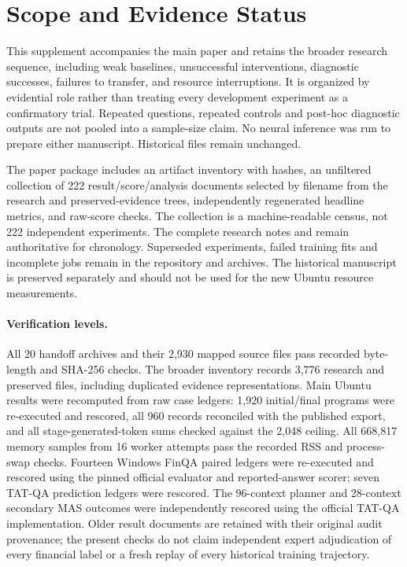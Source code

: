 \documentclass{article}
\begin{document}
\section{Scope and Evidence Status}
This supplement accompanies the main paper and retains the broader research sequence, including weak baselines, unsuccessful interventions, diagnostic successes, failures to transfer, and resource interruptions. It is organized by evidential role rather than treating every development experiment as a confirmatory trial. Repeated questions, repeated controls and post-hoc diagnostic outputs are not pooled into a sample-size claim. No neural inference was run to prepare either manuscript. Historical files remain unchanged.

The paper package includes an artifact inventory with hashes, an unfiltered collection of 222 result/score/analysis documents selected by filename from the research and preserved-evidence trees, independently regenerated headline metrics, and raw-score checks. The collection is a machine-readable census, not 222 independent experiments. The complete research notes and  remain authoritative for chronology. Superseded experiments, failed training fits and incomplete jobs remain in the repository and archives. The historical manuscript is preserved separately and should not be used for the new Ubuntu resource measurements.

\paragraph{Verification levels.}
All 20 handoff archives and their 2,930 mapped source files pass recorded byte-length and SHA-256 checks. The broader inventory records 3,776 research and preserved files, including duplicated evidence representations. Main Ubuntu results were recomputed from raw case ledgers: 1,920 initial/final programs were re-executed and rescored, all 960 records reconciled with the published export, and all stage-generated-token sums checked against the 2,048 ceiling. All 668,817 memory samples from 16 worker attempts pass the recorded RSS and process-swap checks. Fourteen Windows FinQA paired ledgers were re-executed and rescored using the pinned official evaluator and reported-answer scorer; seven TAT-QA prediction ledgers were rescored. The 96-context planner and 28-context secondary MAS outcomes were independently rescored using the official TAT-QA implementation. Older result documents are retained with their original audit provenance; the present checks do not claim independent expert adjudication of every financial label or a fresh replay of every historical training trajectory.
\end{document}

